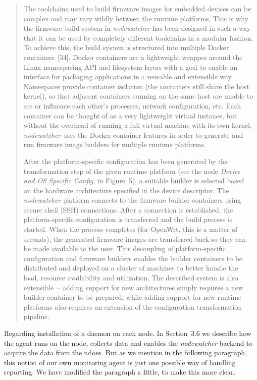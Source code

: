 \documentclass[12pt,twoside,a4paper]{report}
\newcommand{\nodewatcher}{\textit{nodewatcher}}
\begin{document}
\begin{quote}
The toolchains used to build firmware images for embedded devices can be complex and may vary wildly between the runtime platforms.
This is why the firmware build system in \nodewatcher{} has been designed in such a way that it can be used by completely different toolchains in a modular fashion.
To achieve this, the build system is structured into multiple Docker containers~[34].
Docker containers are a lightweight wrapper around the Linux namespacing API and filesystem layers with a goal to enable an interface for packaging applications in a reusable and extensible way.
Namespaces provide container isolation (the containers still share the host kernel), so that adjacent containers running on the same host are unable to see or influence each other's processes, network configuration, etc.
Each container can be thought of as a very lightweight virtual instance, but without the overhead of running a full virtual machine with its own kernel.
\nodewatcher{} uses the Docker container features in order to generate and run firmware image builders for multiple runtime platforms.

After the platform-specific configuration has been generated by the transformation step of the given runtime platform (see the node \textit{Device and OS Specific Config.} in Figure~5), a suitable builder is selected based on the hardware architecture specified in the device descriptor.
The \nodewatcher{} platform connects to the firmware builder containers using secure shell (SSH) connections.
After a connection is established, the platform-specific configuration is transferred and the build process is started.
When the process completes (for OpenWrt, this is a matter of seconds), the generated firmware images are transferred back so they can be made available to the user.
This decoupling of platform-specific configuration and firmware builders enables the builder containers to be distributed and deployed on a cluster of machines to better handle the load, resource availability and utilization.
The described system is also extensible~-- adding support for new architectures simply requires a new builder container to be prepared, while adding support for new runtime platforms also requires an extension of the configuration transformation pipeline.
\end{quote}

Regarding installation of a daemon on each node.
In Section~3.6 we describe how the agent runs on the node, collects data and enables the \nodewatcher{} backend to acquire the data from the ndoes.
But as we mention in the following paragraph, this notion of our own monitoring agent is just one possible way of handling reporting.
We have modified the paragraph a little, to make this more clear.
\end{document}
